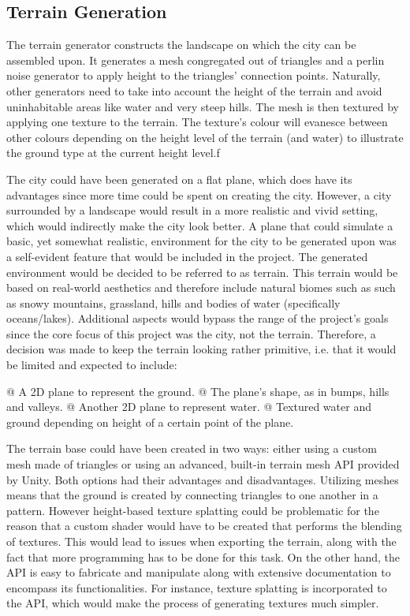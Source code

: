 \subsection{Terrain Generation}

The terrain generator constructs the landscape on which the city can be assembled upon.
It generates a mesh congregated out of triangles and a perlin noise generator to apply height to the triangles' connection points.
Naturally, other generators need to take into account the height of the terrain and avoid uninhabitable areas like water and very steep hills.
The mesh is then textured by applying one texture to the terrain.
The texture’s colour will evanesce between other colours depending on the height level of the terrain (and water) to illustrate the ground type at the current height level.f

The city could have been generated on a flat plane, which does have its advantages since more time could be spent on creating the city.
However, a city surrounded by a landscape would result in a more realistic and vivid setting, which would indirectly make the city look better.
A plane that could simulate a basic, yet somewhat realistic, environment for the city to be generated upon was a self-evident feature that would be included in the project.
The generated environment would be decided to be referred to as terrain.
This terrain would be based on real-world aesthetics and therefore include natural biomes such as such as snowy mountains, grassland, hills and bodies of water (specifically oceans/lakes).
Additional aspects would bypass the range of the project’s goals since the core focus of this project was the city, not the terrain.
Therefore, a decision was made to keep the terrain looking rather primitive, i.e. that it would be limited and expected to include: 

\begin{easylist}
 @ A 2D plane to represent the ground.
 @ The plane’s shape, as in bumps, hills and valleys.
 @ Another 2D plane to represent water.
 @ Textured water and ground depending on height of a certain point of the plane.
\end{easylist}

The terrain base could have been created in two ways: either using a custom mesh made of triangles or using an advanced, built-in terrain mesh API provided by Unity.
Both options had their advantages and disadvantages.
Utilizing meshes means that the ground is created by connecting triangles to one another in a pattern.
However height-based texture splatting could be problematic for the reason that a custom shader would have to be created that performs the blending of textures.
This would lead to issues when exporting the terrain, along with the fact that more programming has to be done for this task.
On the other hand, the API is easy to fabricate and manipulate along with extensive documentation to encompass its functionalities.
For instance, texture splatting is incorporated to the API, which would make the process of generating textures much simpler.

